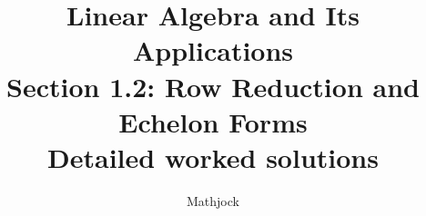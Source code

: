 
\title{\textbf{Linear Algebra and Its Applications}\\[0.3em]Section 1.2: Row Reduction and Echelon Forms\\[0.3em]\large Detailed worked solutions}
\author{Mathjock}
\date{}

\maketitle
\bookinfo
\tableofcontents
\clearpage
\renewcommand{\thesection}{1.\arabic{section}}
\renewcommand{\theHsection}{1.\arabic{section}}
\setcounter{section}{1}



